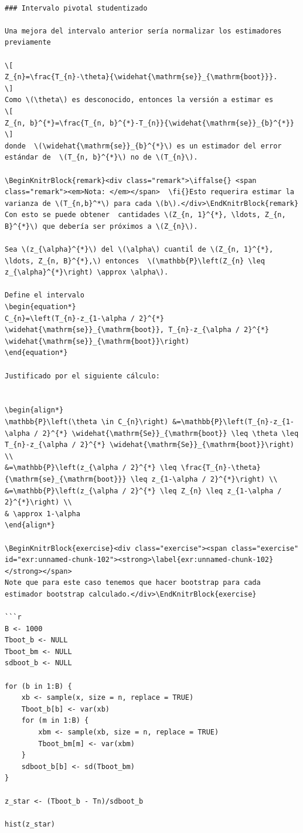 \documentclass[
  12pt,
]{book}
\theoremstyle{definition}
\theoremstyle{definition}
\theoremstyle{definition}
\theoremstyle{remark}
\let\BeginKnitrBlock\begin \let\EndKnitrBlock\end
\begin{document}
\begin{verbatim}

### Intervalo pivotal studentizado

Una mejora del intervalo anterior sería normalizar los estimadores previamente

\[
Z_{n}=\frac{T_{n}-\theta}{\widehat{\mathrm{se}}_{\mathrm{boot}}}.
\]
Como \(\theta\) es desconocido, entonces la versión a estimar es
\[
Z_{n, b}^{*}=\frac{T_{n, b}^{*}-T_{n}}{\widehat{\mathrm{se}}_{b}^{*}}
\]
donde  \(\widehat{\mathrm{se}}_{b}^{*}\) es un estimador del error estándar de  \(T_{n, b}^{*}\) no de \(T_{n}\).

\BeginKnitrBlock{remark}<div class="remark">\iffalse{} <span class="remark"><em>Nota: </em></span>  \fi{}Esto requerira estimar la varianza de \(T_{n,b}^*\) para cada \(b\).</div>\EndKnitrBlock{remark}
Con esto se puede obtener  cantidades \(Z_{n, 1}^{*}, \ldots, Z_{n, B}^{*}\) que debería ser próximos a \(Z_{n}\).

Sea \(z_{\alpha}^{*}\) del \(\alpha\) cuantiĺ de \(Z_{n, 1}^{*}, \ldots, Z_{n, B}^{*},\) entonces  \(\mathbb{P}\left(Z_{n} \leq z_{\alpha}^{*}\right) \approx \alpha\).

Define el intervalo
\begin{equation*}
C_{n}=\left(T_{n}-z_{1-\alpha / 2}^{*} \widehat{\mathrm{se}}_{\mathrm{boot}}, T_{n}-z_{\alpha / 2}^{*} \widehat{\mathrm{se}}_{\mathrm{boot}}\right)
\end{equation*}

Justificado por el siguiente cálculo:


\begin{align*}
\mathbb{P}\left(\theta \in C_{n}\right) &=\mathbb{P}\left(T_{n}-z_{1-\alpha / 2}^{*} \widehat{\mathrm{Se}}_{\mathrm{boot}} \leq \theta \leq T_{n}-z_{\alpha / 2}^{*} \widehat{\mathrm{Se}}_{\mathrm{boot}}\right) \\
&=\mathbb{P}\left(z_{\alpha / 2}^{*} \leq \frac{T_{n}-\theta}{\mathrm{se}_{\mathrm{boot}}} \leq z_{1-\alpha / 2}^{*}\right) \\
&=\mathbb{P}\left(z_{\alpha / 2}^{*} \leq Z_{n} \leq z_{1-\alpha / 2}^{*}\right) \\
& \approx 1-\alpha
\end{align*}

\BeginKnitrBlock{exercise}<div class="exercise"><span class="exercise" id="exr:unnamed-chunk-102"><strong>\label{exr:unnamed-chunk-102} </strong></span>
Note que para este caso tenemos que hacer bootstrap para cada estimador bootstrap calculado.</div>\EndKnitrBlock{exercise}

```r
B <- 1000
Tboot_b <- NULL
Tboot_bm <- NULL
sdboot_b <- NULL

for (b in 1:B) {
    xb <- sample(x, size = n, replace = TRUE)
    Tboot_b[b] <- var(xb)
    for (m in 1:B) {
        xbm <- sample(xb, size = n, replace = TRUE)
        Tboot_bm[m] <- var(xbm)
    }
    sdboot_b[b] <- sd(Tboot_bm)
}

z_star <- (Tboot_b - Tn)/sdboot_b

hist(z_star)
\end{verbatim}
\end{document}

